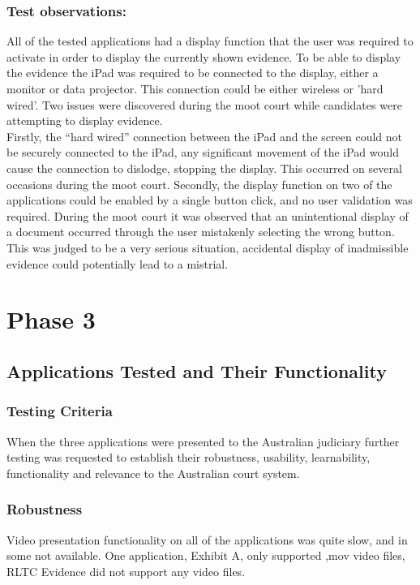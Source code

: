 \subsubsection{Test observations:}
All of the tested applications had a display function that the user was required to activate in order to display the currently shown evidence. To be able to display the evidence the iPad was required to be connected to the display, either a monitor or data projector. This connection could be either wireless or 'hard wired'. Two issues were discovered during the moot court while candidates were attempting to display evidence. \\
Firstly, the ``hard wired'' connection between the iPad and the screen could not be securely connected to the iPad, any significant movement of the iPad would cause the connection to dislodge, stopping the display. This occurred on several occasions during the moot court.
Secondly, the display function on two of the applications could be enabled by a single button click, and no user validation was required. During the moot court it was observed that an unintentional display of a document occurred through the user mistakenly selecting the wrong button. This was judged to be a very serious situation, accidental display of inadmissible evidence could potentially lead to a mistrial.



\section{Phase 3\label{Phase3}}
\subsection{Applications Tested and Their Functionality}
\subsubsection{Testing Criteria}
When the three applications were presented to the Australian judiciary further testing was requested to establish their robustness, usability, learnability, functionality and relevance to the Australian court system.
\subsubsection{Robustness}
Video presentation functionality on all of the applications was quite slow, and in some not available. One application, Exhibit A, only supported ,mov video files, RLTC Evidence did not support any video files.
